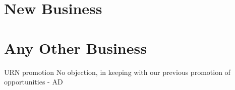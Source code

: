 \documentclass[11pt,hacksoc]{meetingmins}
\begin{document}
\section{New Business}

\section{Any Other Business}
\begin{items}
\item URN promotion
\subitem No objection, in keeping with our previous promotion of opportunities - AD
\end{items}

\vspace{1em}
\end{document}
